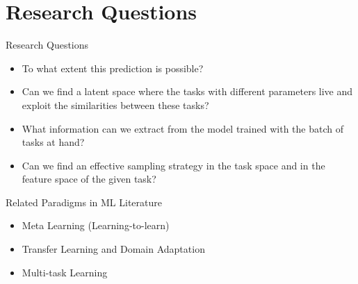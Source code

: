 \section{Research Questions}
\begin{frame}{Research Questions}
  \begin{itemize}
    \item To what extent this prediction is possible?
    \item Can we find a latent space where the tasks with different parameters live and exploit the similarities between these tasks?
    \item What information can we extract from the model trained with the batch of tasks at hand?
    \item Can we find an effective sampling strategy in the task space and in the feature space of the given task?
  \end{itemize}
\end{frame}

\begin{frame}{Related Paradigms in ML Literature}
  \begin{itemize}
    \centering
    \item \color{Pink} Meta Learning (Learning-to-learn) \color{Black}
    \item Transfer Learning and Domain Adaptation
    \item Multi-task Learning
  \end{itemize}
\end{frame}

